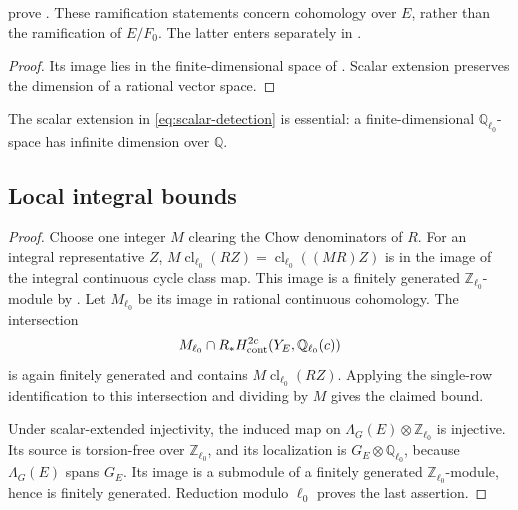 \documentclass[11pt,a4paper]{article}
\newtheorem{proposition}[theorem]{Proposition}
\newtheorem{corollary}[theorem]{Corollary}
\theoremstyle{definition}
\DeclareRobustCommand{\MathSecref}[1]{\begingroup\hypersetup{linkcolor=MathSectionLink}\Cref{#1}\endgroup}
\DeclareRobustCommand{\MathEqref}[1]{\begingroup\hypersetup{linkcolor=MathEquationLink}\eqref{#1}\endgroup}
\newcommand{\Q}{\mathbb Q}\newcommand{\R}{\mathbb R}\newcommand{\C}{\mathbb C}
\newcommand{\Z}{\mathbb Z}\newcommand{\A}{\mathbb A}\newcommand{\Fbar}{\overline F}
\newcommand{\cl}{\operatorname{cl}}\newcommand{\ch}{\operatorname{ch}}
\numberwithin{equation}{section}
\begin{document}
 prove
. These ramification statements concern
cohomology over \(E\), rather than the ramification of
\(E/F_0\). The latter enters separately in
\MathSecref{sec:fields}.


\begin{proof}
Its image lies in the finite-dimensional space of
. Scalar extension preserves the dimension of
a rational vector space.
\end{proof}

The scalar extension in \MathEqref{eq:scalar-detection} is
essential: a finite-dimensional \(\Q_{\ell_0}\)-space has
infinite dimension over \(\Q\).

\subsection{Local integral bounds}\label{sec:local-integral}


\begin{proof}
Choose one integer \(M\) clearing the Chow denominators of \(R\).
For an integral representative \(Z\),
\(M\cl_{\ell_0}(RZ)=\cl_{\ell_0}((MR)Z)\) is in the image of
the integral continuous cycle class map. This image is a finitely
generated \(\Z_{\ell_0}\)-module by
\cite[Theorem~2.4]{Kahn}. Let \(M_{\ell_0}\) be its image in
rational continuous cohomology. The intersection
\[
 M_{\ell_0}\cap R_*H^{2c}_{\cont}(Y_E,\Q_{\ell_0}(c))
\]
is again finitely generated and contains
\(M\cl_{\ell_0}(RZ)\). Applying the single-row identification
to this intersection and dividing by \(M\) gives the claimed bound.

Under scalar-extended injectivity, the induced map on
\(\Lambda_G(E)\otimes\Z_{\ell_0}\) is injective. Its source is
torsion-free over \(\Z_{\ell_0}\), and its localization is
\(G_E\otimes\Q_{\ell_0}\), because \(\Lambda_G(E)\) spans
\(G_E\). Its image is a submodule of a finitely generated
\(\Z_{\ell_0}\)-module, hence is finitely generated. Reduction
modulo \(\ell_0\) proves the last assertion.
\end{proof}
\end{document}
